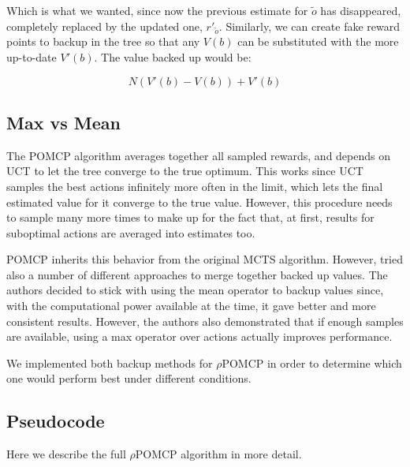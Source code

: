 Which is what we wanted, since now the previous estimate for $\tilde{o}$ has disappeared, completely
replaced by the updated one, $r'_{\tilde{o}}$. Similarly, we can create fake reward points to backup
in the tree so that any $V(b)$ can be substituted with the more up-to-date $V'(b)$. The value backed
up would be:

\[ N ( V'(b) - V(b) ) + V'(b) \]

%

\subsection{Max vs Mean}

The POMCP algorithm averages together all sampled rewards, and depends on UCT to let the tree
converge to the true optimum. This works since UCT samples the best actions infinitely more often in
the limit, which lets the final estimated value for it converge to the true value. However, this
procedure needs to sample many more times to make up for the fact that, at first, results for
suboptimal actions are averaged into estimates too.

POMCP inherits this behavior from the original MCTS algorithm. However, \citet{cit:mcts} tried also
a number of different approaches to merge together backed up values. The authors decided to stick
with using the mean operator to backup values since, with the computational power available at the
time, it gave better and more consistent results.  However, the authors also demonstrated that if
enough samples are available, using a max operator over actions actually improves performance.

We implemented both backup methods for $\rho$POMCP in order to determine which one would perform
best under different conditions.

\subsection{Pseudocode}

Here we describe the full $\rho$POMCP algorithm in more detail.

